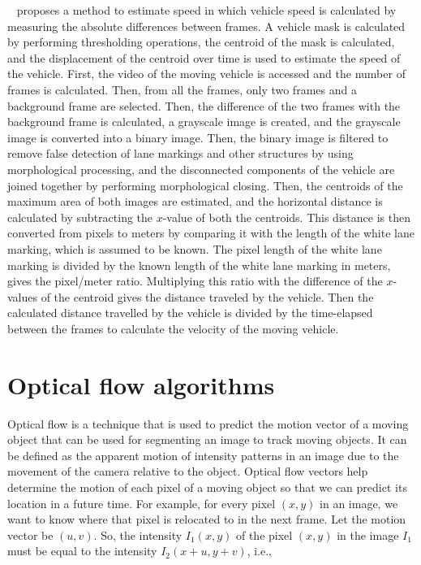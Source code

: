 \documentclass[a4paper]{aitthesis}
\begin{document}
~ proposes a method to estimate speed in which vehicle speed is calculated by measuring the absolute differences between frames. A vehicle mask is calculated by performing thresholding operations, the centroid of the mask is calculated, and the displacement of the centroid over time is used to estimate the speed of the vehicle. First, the video of the moving vehicle is accessed and the number of frames is calculated. Then, from all the frames, only two frames and a background frame are selected. Then, the difference of the two frames with the background frame is calculated, a grayscale image is created, and the grayscale image is converted into a binary image. Then, the binary image is filtered to remove false detection of lane markings and other structures by using morphological processing, and the disconnected components of the vehicle are joined together by performing morphological closing. Then, the centroids of the maximum area of both images are estimated, and the horizontal distance is calculated by subtracting the $x$-value of both the centroids. This distance is then converted from pixels to meters by comparing it with the length of the white lane marking, which is assumed to be known. The pixel length of the white lane marking is divided by the known length of the white lane marking in meters, gives the pixel/meter ratio. Multiplying this ratio with the difference of the $x$-values of the centroid gives the distance traveled by the vehicle. Then the calculated distance travelled by the vehicle is divided by the time-elapsed between the frames to calculate the velocity of the moving vehicle.

\section{Optical flow algorithms}
Optical flow is a technique that is used to predict the motion vector of a moving object that can be used for segmenting an image to track moving objects. It can be defined as the apparent motion of intensity patterns in an image due to the movement of the camera relative to the object. Optical flow vectors help determine the motion of each pixel of a moving object so that we can predict its location in a future time. 
\newline For example, for every pixel $(x,y)$ in an image, we want to know where that pixel is relocated to in the next frame. Let the motion vector be $(u,v)$. So, the intensity $I_1(x,y)$ of the pixel $(x,y)$ in the image $I_1$ must be equal to the intensity $I_2(x+u, y+v)$, i.e.,
\end{document}
